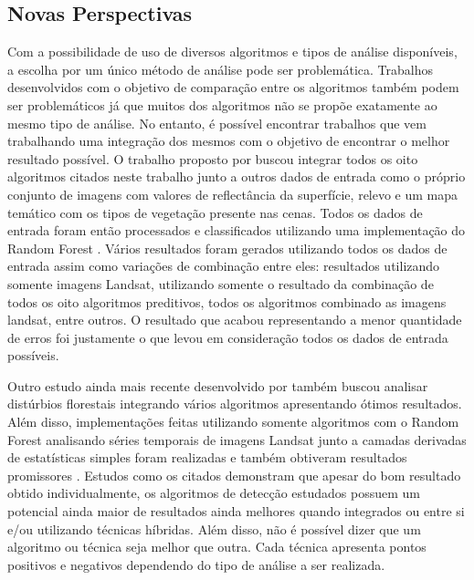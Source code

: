 \documentclass[12pt,a4paper]{article}
\begin{document}
\subsection{Novas Perspectivas}
\hspace{13pt} Com a possibilidade de uso de diversos algoritmos e tipos de análise disponíveis, a escolha por um único método de análise pode ser problemática. Trabalhos desenvolvidos com o objetivo de comparação entre os algoritmos também podem ser problemáticos já que muitos dos algoritmos não se propõe exatamente ao mesmo tipo de análise. No entanto, é possível encontrar trabalhos que vem trabalhando uma integração dos mesmos com o objetivo de encontrar o melhor resultado possível. O trabalho proposto por \citep{HEALEY2018717} buscou integrar todos os oito algoritmos citados neste trabalho junto a outros dados de entrada como o próprio conjunto de imagens com valores de reflectância da superfície, relevo e um mapa temático com os tipos de vegetação presente nas cenas. Todos os dados de entrada foram então processados e classificados utilizando uma implementação do Random Forest \citep{Breiman2001}. Vários resultados foram gerados utilizando todos os dados de entrada assim como variações de combinação entre eles: resultados utilizando somente imagens Landsat, utilizando somente o resultado da combinação de todos os oito algoritmos preditivos, todos os algoritmos combinado as imagens landsat, entre outros. O resultado que acabou representando a menor quantidade de erros foi justamente o que levou em consideração todos os dados de entrada possíveis.

Outro estudo ainda mais recente desenvolvido por \citep{BULLOCK2019111165} também buscou analisar distúrbios florestais integrando vários algoritmos apresentando ótimos resultados. Além disso, implementações feitas utilizando somente algoritmos com o Random Forest analisando séries temporais de imagens Landsat junto a camadas derivadas de estatísticas simples foram realizadas e também obtiveram resultados promissores \citep{WANG2019474}.
Estudos como os citados demonstram que apesar do bom resultado obtido individualmente, os algoritmos de detecção estudados possuem um potencial ainda maior de resultados ainda melhores quando integrados ou entre si e/ou utilizando técnicas híbridas. Além disso, não é possível dizer que um algoritmo ou técnica seja melhor que outra. Cada técnica apresenta pontos positivos e negativos dependendo do tipo de análise a ser realizada.
\end{document}

